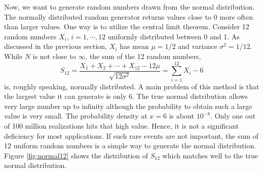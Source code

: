 Now, we want to generate random numbers drawn from the normal distribution.  The normally distributed random generator returns values close to 0 more often than larger values.  One way is to utilize the central limit theorem. Consider 12 random numbers $X_i,\, i=1, \cdots, 12$ uniformly distributed between 0 and 1. As discussed in the previous section, $X_i$ has mean $\mu=1/2$ and variance $\sigma^2=1/12$.  While $N$ is not close to $\infty$, the sum of the 12 random numbers,
\begin{equation}
S_{12} = \frac{X_1 + X_2 + \cdots + X_{12} - 12 \mu}{\sqrt{12 \sigma^2}} = \sum_{i=1}^{12} X_i - 6
\end{equation}
is, roughly speaking, normally distributed.  A main problem of this method is that the largest value it can generate is only 6.  The true normal distribution allows very large number up to infinity although the probability to  obtain such a large value is very small. The probability density at $x=6$ is about $10^{-8}$.  Only one out of 100 million realizations hits that high value.  Hence, it is not a significant deficiency for most applications.  If such rare events are not important, the sum of 12 uniform random numbers is a simple way to generate the normal distribution.  Figure \ref{fig:normal12} shows the distribution of $S_{12}$ which matches well to the true normal distribution.

